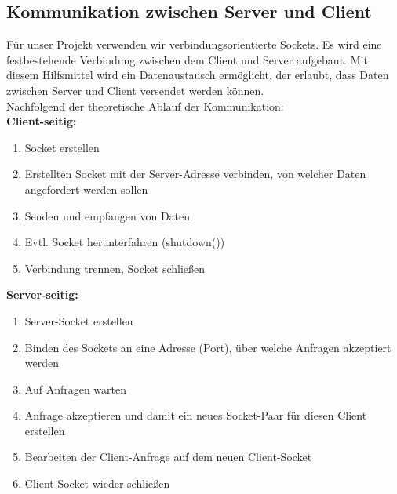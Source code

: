 \documentclass{scrartcl}
\begin{document}
	\subsection{Kommunikation zwischen Server und Client}
		Für unser Projekt verwenden wir verbindungsorientierte Sockets. Es wird eine festbestehende Verbindung zwischen dem Client und Server aufgebaut. Mit diesem Hilfsmittel wird ein Datenaustausch ermöglicht, der erlaubt, dass Daten zwischen Server und Client versendet werden können.\\
		Nachfolgend der theoretische Ablauf der Kommunikation:\\
		
		
		\textbf{Client-seitig:}
		\begin{enumerate}
			\item Socket erstellen
			\item Erstellten Socket mit der Server-Adresse verbinden, von welcher Daten angefordert werden sollen
			\item Senden und empfangen von Daten
			\item Evtl. Socket herunterfahren (shutdown())
			\item Verbindung trennen, Socket schließen
		\end{enumerate}
		
		\textbf{Server-seitig:}
		\begin{enumerate}
			\item Server-Socket erstellen
			\item Binden des Sockets an eine Adresse (Port), über welche Anfragen akzeptiert werden
			\item Auf Anfragen warten
			\item Anfrage akzeptieren und damit ein neues Socket-Paar für diesen Client erstellen
			\item Bearbeiten der Client-Anfrage auf dem neuen Client-Socket
			\item Client-Socket wieder schließen
		\end{enumerate}

\newpage
\end{document}
